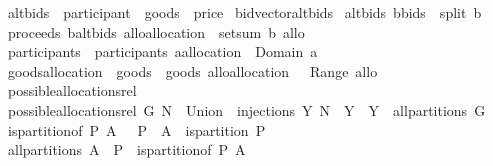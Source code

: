 \begin{isabellebody}
\ altbids\ {\isacharequal}\ {\isachardoublequoteopen}{\isacharparenleft}participant\ {\isasymtimes}\ goods{\isacharparenright}\ {\isasymRightarrow}\ price{\isachardoublequoteclose}\isanewline
{}\isamarkupfalse%
\ bidvector{\isacharequal}altbids\isanewline
{}\isamarkupfalse%
\ {\isachardoublequoteopen}altbids\ {\isacharparenleft}b{\isacharcolon}{\isacharcolon}bids{\isacharparenright}\ {\isacharequal}{\isacharequal}\ split\ b{\isachardoublequoteclose}\isanewline
\isanewline
{}\isamarkupfalse%
\ {\isachardoublequoteopen}proceeds\ {\isacharparenleft}b{\isacharcolon}{\isacharcolon}altbids{\isacharparenright}\ {\isacharparenleft}allo{\isacharcolon}{\isacharcolon}allocation{\isacharparenright}\ {\isacharequal}{\isacharequal}\ setsum\ b\ allo{\isachardoublequoteclose}\isanewline
\isanewline
{}\isamarkupfalse%
\ participants\ \ {\isachardoublequoteopen}participants\ {\isacharparenleft}a{\isacharcolon}{\isacharcolon}allocation{\isacharparenright}\ {\isacharequal}{\isacharequal}\ Domain\ a{\isachardoublequoteclose}\isanewline
{}\isamarkupfalse%
\ goods{\isacharcolon}{\isacharcolon}{\isachardoublequoteopen}allocation\ {\isacharequal}{\isachargreater}\ goods{\isachardoublequoteclose}\ \ {\isachardoublequoteopen}goods\ {\isacharparenleft}allo{\isacharcolon}{\isacharcolon}allocation{\isacharparenright}\ {\isacharequal}{\isacharequal}\ {\isasymUnion}\ {\isacharparenleft}Range\ allo{\isacharparenright}{\isachardoublequoteclose}%
\isamarkuptrue%
\isamarkupfalse%
\ possible{\isacharunderscore}allocations{\isacharunderscore}rel\ \isanewline
{}\ {\isachardoublequoteopen}possible{\isacharunderscore}allocations{\isacharunderscore}rel\ G\ N\ {\isacharequal}\ Union\ {\isacharbraceleft}\ injections\ Y\ N\ {\isacharbar}\ Y\ {\isachardot}\ Y\ {\isasymin}\ all{\isacharunderscore}partitions\ G\ {\isacharbraceright}{\isachardoublequoteclose}\ \isanewline
\isanewline
{}\isamarkupfalse%
\ {\isachardoublequoteopen}is{\isacharunderscore}partition{\isacharunderscore}of{\isacharprime}\ P\ A\ {\isacharequal}{\isacharequal}\ {\isacharparenleft}{\isasymUnion}\ P\ {\isacharequal}\ A\ {\isasymand}\ is{\isacharunderscore}partition\ P{\isacharparenright}{\isachardoublequoteclose}\isanewline
\isanewline
{}\isamarkupfalse%
\ {\isachardoublequoteopen}all{\isacharunderscore}partitions{\isacharprime}\ A\ {\isacharequal}{\isacharequal}\ {\isacharbraceleft}P\ {\isachardot}\ is{\isacharunderscore}partition{\isacharunderscore}of{\isacharprime}\ P\ A{\isacharbraceright}{\isachardoublequoteclose}\isanewline

\end{isabellebody}
